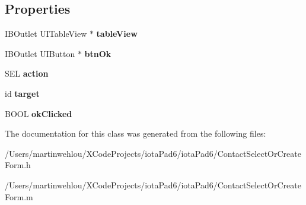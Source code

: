 \subsection*{Properties}
\begin{DoxyCompactItemize}
\item 
\hypertarget{interface_contact_select_or_create_form_a03bc37d2dbd887c4b427c3b4fab8a93f}{
IBOutlet UITableView $\ast$ {\bfseries tableView}}
\label{interface_contact_select_or_create_form_a03bc37d2dbd887c4b427c3b4fab8a93f}

\item 
\hypertarget{interface_contact_select_or_create_form_acd5b39949136a0efb1600cdb7a4c959a}{
IBOutlet UIButton $\ast$ {\bfseries btnOk}}
\label{interface_contact_select_or_create_form_acd5b39949136a0efb1600cdb7a4c959a}

\item 
\hypertarget{interface_contact_select_or_create_form_a0888a0e4de74c626a14ef9e0c682cf64}{
SEL {\bfseries action}}
\label{interface_contact_select_or_create_form_a0888a0e4de74c626a14ef9e0c682cf64}

\item 
\hypertarget{interface_contact_select_or_create_form_a76b5ae3e0145782412c11d643330bdca}{
id {\bfseries target}}
\label{interface_contact_select_or_create_form_a76b5ae3e0145782412c11d643330bdca}

\item 
\hypertarget{interface_contact_select_or_create_form_a3801bc0cd142df9fc55b57a709bf80a5}{
BOOL {\bfseries okClicked}}
\label{interface_contact_select_or_create_form_a3801bc0cd142df9fc55b57a709bf80a5}

\end{DoxyCompactItemize}


The documentation for this class was generated from the following files:\begin{DoxyCompactItemize}
\item 
/Users/martinwehlou/XCodeProjects/iotaPad6/iotaPad6/ContactSelectOrCreateForm.h\item 
/Users/martinwehlou/XCodeProjects/iotaPad6/iotaPad6/ContactSelectOrCreateForm.m\end{DoxyCompactItemize}
